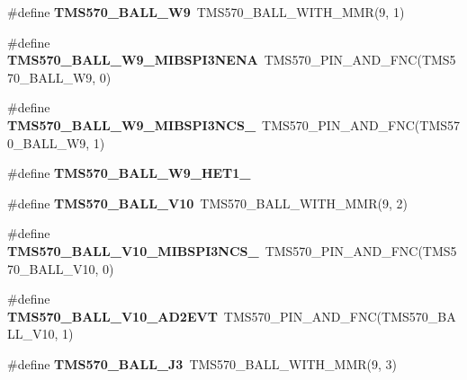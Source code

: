 \begin{DoxyCompactItemize}
\mbox{\label{tms570ls3137zwt-pins_8h_a2ecbe71d7ef160f4581b1531c353ec3d}} 
\#define {\bfseries T\+M\+S570\+\_\+\+B\+A\+L\+L\+\_\+\+W9}~T\+M\+S570\+\_\+\+B\+A\+L\+L\+\_\+\+W\+I\+T\+H\+\_\+\+M\+MR(9, 1)
\item 
\mbox{\label{tms570ls3137zwt-pins_8h_aed32e5fcc1a3627fa3c98c7d481aef69}} 
\#define {\bfseries T\+M\+S570\+\_\+\+B\+A\+L\+L\+\_\+\+W9\+\_\+\+M\+I\+B\+S\+P\+I3\+N\+E\+NA}~T\+M\+S570\+\_\+\+P\+I\+N\+\_\+\+A\+N\+D\+\_\+\+F\+NC(T\+M\+S570\+\_\+\+B\+A\+L\+L\+\_\+\+W9, 0)
\item 
\mbox{\label{tms570ls3137zwt-pins_8h_abb834fe4d84a05e0cba6c0ca2b4d6c70}} 
\#define {\bfseries T\+M\+S570\+\_\+\+B\+A\+L\+L\+\_\+\+W9\+\_\+\+M\+I\+B\+S\+P\+I3\+N\+C\+S\+\_}~T\+M\+S570\+\_\+\+P\+I\+N\+\_\+\+A\+N\+D\+\_\+\+F\+NC(T\+M\+S570\+\_\+\+B\+A\+L\+L\+\_\+\+W9, 1)
\item 
\#define {\bfseries T\+M\+S570\+\_\+\+B\+A\+L\+L\+\_\+\+W9\+\_\+\+H\+E\+T1\+\_}
\item 
\mbox{\label{tms570ls3137zwt-pins_8h_aa215acb293508e5f131a4957577d14a6}} 
\#define {\bfseries T\+M\+S570\+\_\+\+B\+A\+L\+L\+\_\+\+V10}~T\+M\+S570\+\_\+\+B\+A\+L\+L\+\_\+\+W\+I\+T\+H\+\_\+\+M\+MR(9, 2)
\item 
\mbox{\label{tms570ls3137zwt-pins_8h_aa5f3f15154d2351591400b00acced6d7}} 
\#define {\bfseries T\+M\+S570\+\_\+\+B\+A\+L\+L\+\_\+\+V10\+\_\+\+M\+I\+B\+S\+P\+I3\+N\+C\+S\+\_}~T\+M\+S570\+\_\+\+P\+I\+N\+\_\+\+A\+N\+D\+\_\+\+F\+NC(T\+M\+S570\+\_\+\+B\+A\+L\+L\+\_\+\+V10, 0)
\item 
\mbox{\label{tms570ls3137zwt-pins_8h_a13936226dad2e37ff4a69ae6dd63af69}} 
\#define {\bfseries T\+M\+S570\+\_\+\+B\+A\+L\+L\+\_\+\+V10\+\_\+\+A\+D2\+E\+VT}~T\+M\+S570\+\_\+\+P\+I\+N\+\_\+\+A\+N\+D\+\_\+\+F\+NC(T\+M\+S570\+\_\+\+B\+A\+L\+L\+\_\+\+V10, 1)
\item 
\mbox{\label{tms570ls3137zwt-pins_8h_a1795b598acd2954e07181a8b30e144aa}} 
\#define {\bfseries T\+M\+S570\+\_\+\+B\+A\+L\+L\+\_\+\+J3}~T\+M\+S570\+\_\+\+B\+A\+L\+L\+\_\+\+W\+I\+T\+H\+\_\+\+M\+MR(9, 3)
\item 

\end{DoxyCompactItemize}
